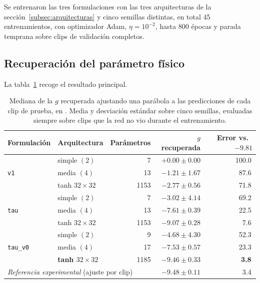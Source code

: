 \documentclass[titlepage,11pt]{article}
\providecommand{\SI}[2]{#1\,#2}
\providecommand{\percent}{\char37\relax}
\begin{document}
Se entrenaron las tres formulaciones con las tres arquitecturas de la
sección~\ref{subsec:arquitecturas} y cinco semillas distintas, en total 45
entrenamientos, con optimizador Adam, $\eta=10^{-2}$, hasta 800 épocas y parada
temprana sobre clips de validación completos.

\subsection{Recuperación del parámetro físico}
\label{subsec:v2_g}

La tabla~\ref{tab:v2g} recoge el resultado principal.

\begin{table}[H]
  \centering
  \begin{tabular}{llrrr}
    \toprule
    Formulación & Arquitectura & Parámetros & $g$ recuperada & Error vs.\ $-9.81$ \\
    \midrule
    \multirow{3}{*}{\texttt{v1}}
      & simple $(2)$    & 7    & $+0.00 \pm 0.00$ & \SI{100.0}{\percent} \\
      & media $(4)$     & 13   & $-1.21 \pm 1.67$ & \SI{87.6}{\percent} \\
      & tanh $32\times32$ & 1153 & $-2.77 \pm 0.56$ & \SI{71.8}{\percent} \\
    \midrule
    \multirow{3}{*}{\texttt{tau}}
      & simple $(2)$    & 7    & $-3.02 \pm 4.14$ & \SI{69.2}{\percent} \\
      & media $(4)$     & 13   & $-7.61 \pm 0.39$ & \SI{22.5}{\percent} \\
      & tanh $32\times32$ & 1153 & $-9.07 \pm 0.28$ & \SI{7.6}{\percent} \\
    \midrule
    \multirow{3}{*}{\texttt{tau\_v0}}
      & simple $(2)$    & 9    & $-4.68 \pm 4.30$ & \SI{52.3}{\percent} \\
      & media $(4)$     & 17   & $-7.53 \pm 0.57$ & \SI{23.3}{\percent} \\
      & \textbf{tanh $32\times32$} & 1185 & $\mathbf{-9.46 \pm 0.33}$
        & \textbf{\SI{3.8}{\percent}} \\
    \midrule
    \multicolumn{3}{l}{\emph{Referencia experimental} (ajuste por clip)}
      & $-9.48 \pm 0.11$ & \SI{3.4}{\percent} \\
    \bottomrule
  \end{tabular}
  \caption{Mediana de la $g$ recuperada ajustando una parábola a las
    predicciones de cada clip de prueba, en \meter\per\second\squared. Media y
    desviación estándar sobre cinco semillas, evaluadas siempre sobre clips que
    la red no vio durante el entrenamiento.}
  \label{tab:v2g}
\end{table}
\end{document}
